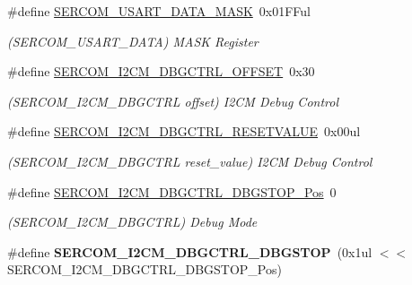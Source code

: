 \begin{DoxyCompactItemize}
\item 
\hypertarget{group___s_a_m_l21___s_e_r_c_o_m_ga1cd041b9e29d25cd2e6fbfd2293d3847}{}\#define \hyperlink{group___s_a_m_l21___s_e_r_c_o_m_ga1cd041b9e29d25cd2e6fbfd2293d3847}{S\+E\+R\+C\+O\+M\+\_\+\+U\+S\+A\+R\+T\+\_\+\+D\+A\+T\+A\+\_\+\+M\+A\+S\+K}~0x01\+F\+Ful\label{group___s_a_m_l21___s_e_r_c_o_m_ga1cd041b9e29d25cd2e6fbfd2293d3847}

\begin{DoxyCompactList}\small\item\em (S\+E\+R\+C\+O\+M\+\_\+\+U\+S\+A\+R\+T\+\_\+\+D\+A\+T\+A) M\+A\+S\+K Register \end{DoxyCompactList}\item 
\hypertarget{group___s_a_m_l21___s_e_r_c_o_m_gadff698c8d0cc5b6bd44d17dd4787be2c}{}\#define \hyperlink{group___s_a_m_l21___s_e_r_c_o_m_gadff698c8d0cc5b6bd44d17dd4787be2c}{S\+E\+R\+C\+O\+M\+\_\+\+I2\+C\+M\+\_\+\+D\+B\+G\+C\+T\+R\+L\+\_\+\+O\+F\+F\+S\+E\+T}~0x30\label{group___s_a_m_l21___s_e_r_c_o_m_gadff698c8d0cc5b6bd44d17dd4787be2c}

\begin{DoxyCompactList}\small\item\em (S\+E\+R\+C\+O\+M\+\_\+\+I2\+C\+M\+\_\+\+D\+B\+G\+C\+T\+R\+L offset) I2\+C\+M Debug Control \end{DoxyCompactList}\item 
\hypertarget{group___s_a_m_l21___s_e_r_c_o_m_gaab03eb045cf3a7b62e3507c2d4ba9953}{}\#define \hyperlink{group___s_a_m_l21___s_e_r_c_o_m_gaab03eb045cf3a7b62e3507c2d4ba9953}{S\+E\+R\+C\+O\+M\+\_\+\+I2\+C\+M\+\_\+\+D\+B\+G\+C\+T\+R\+L\+\_\+\+R\+E\+S\+E\+T\+V\+A\+L\+U\+E}~0x00ul\label{group___s_a_m_l21___s_e_r_c_o_m_gaab03eb045cf3a7b62e3507c2d4ba9953}

\begin{DoxyCompactList}\small\item\em (S\+E\+R\+C\+O\+M\+\_\+\+I2\+C\+M\+\_\+\+D\+B\+G\+C\+T\+R\+L reset\+\_\+value) I2\+C\+M Debug Control \end{DoxyCompactList}\item 
\hypertarget{group___s_a_m_l21___s_e_r_c_o_m_ga7a07b16a2d9fa67f1bf52713bf2d937c}{}\#define \hyperlink{group___s_a_m_l21___s_e_r_c_o_m_ga7a07b16a2d9fa67f1bf52713bf2d937c}{S\+E\+R\+C\+O\+M\+\_\+\+I2\+C\+M\+\_\+\+D\+B\+G\+C\+T\+R\+L\+\_\+\+D\+B\+G\+S\+T\+O\+P\+\_\+\+Pos}~0\label{group___s_a_m_l21___s_e_r_c_o_m_ga7a07b16a2d9fa67f1bf52713bf2d937c}

\begin{DoxyCompactList}\small\item\em (S\+E\+R\+C\+O\+M\+\_\+\+I2\+C\+M\+\_\+\+D\+B\+G\+C\+T\+R\+L) Debug Mode \end{DoxyCompactList}\item 
\hypertarget{group___s_a_m_l21___s_e_r_c_o_m_ga327fdede48060721b95711635a6cb4c5}{}\#define {\bfseries S\+E\+R\+C\+O\+M\+\_\+\+I2\+C\+M\+\_\+\+D\+B\+G\+C\+T\+R\+L\+\_\+\+D\+B\+G\+S\+T\+O\+P}~(0x1ul $<$$<$ S\+E\+R\+C\+O\+M\+\_\+\+I2\+C\+M\+\_\+\+D\+B\+G\+C\+T\+R\+L\+\_\+\+D\+B\+G\+S\+T\+O\+P\+\_\+\+Pos)\label{group___s_a_m_l21___s_e_r_c_o_m_ga327fdede48060721b95711635a6cb4c5}


\end{DoxyCompactItemize}

